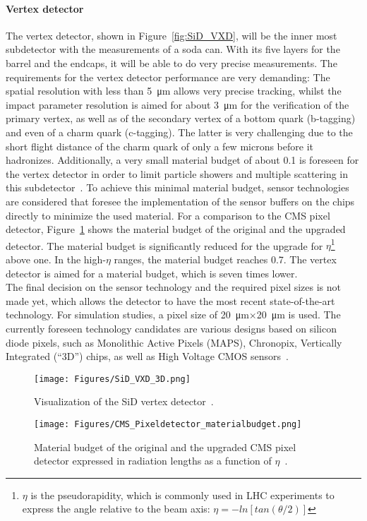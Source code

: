 \paragraph{Vertex detector}
The vertex detector, shown in Figure~\ref{fig:SiD_VXD}, will be the inner most subdetector with the measurements of a soda can.
With its five layers for the barrel and the endcaps, it will be able to do very precise measurements.
The requirements for the vertex detector performance are very demanding:
The spatial resolution with less than \SI{5}{\micro\meter} allows very precise tracking, whilst the impact parameter resolution is aimed for about \SI{3}{\micro\meter} for the verification of the primary vertex, as well as of the secondary vertex of a bottom quark (b-tagging) and even of a charm quark (c-tagging).
The latter is very challenging due to the short flight distance of the charm quark of only a few microns before it hadronizes.
Additionally, a very small material budget of about \SI{0.1}{\xzero} is foreseen for the vertex detector in order to limit particle showers and multiple scattering in this subdetector~\cite{SiD_Update}.
To achieve this minimal material budget, sensor technologies are considered that foresee the implementation of the sensor buffers on the chips directly to minimize the used material. 
For a comparison to the CMS pixel detector, Figure~\ref{fig:CMS} shows the material budget of the original and the upgraded detector.
The material budget is significantly reduced for the upgrade for $\eta$\footnote{$\eta$ is the pseudorapidity, which is commonly used in LHC experiments to express the angle relative to the beam axis: $\eta=-ln[tan(\theta/2)]$} above one.
In the high-$\eta$ ranges, the material budget reaches \SI{0.7}{\xzero}.
The \sid vertex detector is aimed for a material budget, which is seven times lower.
\\The final decision on the \sid sensor technology and the required pixel sizes is not made yet, which allows the detector to have the most recent state-of-the-art technology.
For simulation studies, a pixel size of \SI{20}{\micro\meter}$\times$\SI{20}{\micro\meter} is used.
The currently foreseen technology candidates are various designs based on silicon diode pixels, such as Monolithic Active Pixels (MAPS), Chronopix, Vertically Integrated (``3D'') chips, as well as High Voltage CMOS sensors~\cites[p. 70 ff]{TDR4}[p. 319 ff]{spieler}. 
\begin{figure}[!h]
\centering
 \begin{minipage}[t]{0.49\textwidth}
 \centering
\texttt{[image: Figures/SiD\_VXD\_3D.png]}
\caption[Visualization of the SiD vertex detector]{Visualization of the SiD vertex detector~\cite{SiD_Update2}.}
\label{fig:SiD_VXD}
\end{minipage}
\hfill
\begin{minipage}[t]{0.49\textwidth}
\centering
\texttt{[image: Figures/CMS\_Pixeldetector\_materialbudget.png]}
\caption[Material budget of the CMS pixel detector]{Material budget of the original and the upgraded CMS pixel detector expressed in radiation lengths as a function of $\eta$~\cite{CMS_pixeldetector}.}
\label{fig:CMS}
\end{minipage}
\end{figure}



